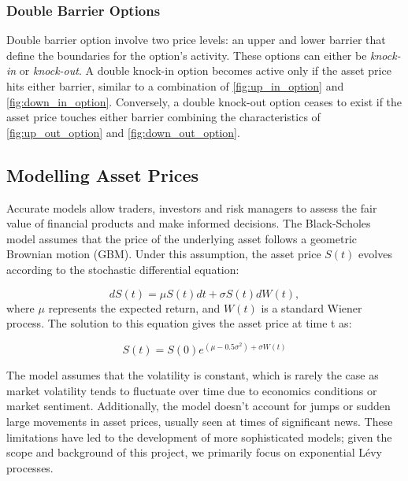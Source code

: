 \documentclass[a4paper]{report}
\begin{document}
\subsubsection{Double Barrier Options}
Double barrier option involve two price levels: an upper and lower barrier that define the boundaries for the option's activity. These options can either be \textit{knock-in} or \textit{knock-out}. A double knock-in option becomes active only if the asset price hits either barrier, similar to a combination of \autoref{fig:up_in_option} and \autoref{fig:down_in_option}. Conversely, a double knock-out option ceases to exist if the asset price touches either barrier combining the characteristics of \autoref{fig:up_out_option} and \autoref{fig:down_out_option}.

\subsection{Modelling Asset Prices}
Accurate models allow traders, investors and risk managers to assess the fair value of financial products and make informed decisions. The Black-Scholes model assumes that the price of the underlying asset follows a geometric Brownian motion (GBM). Under this assumption, the asset price $S(t)$ evolves according to the stochastic differential equation:

\begin{equation}\label{black_scholes_equation}
dS(t) = \mu S(t) dt + \sigma S(t) dW(t),	
\end{equation}
where $\mu$ represents the expected return, and $W(t)$ is a standard Wiener process. The solution to this equation gives the asset price at time t as:

\begin{equation}
S(t) = S(0)e^{(\mu - 0.5 \sigma^2) + \sigma W(t)}	
\end{equation}


The model assumes that the volatility is constant, which is rarely the case as market volatility tends to fluctuate over time due to economics conditions or market sentiment. Additionally, the model doesn't account for jumps or sudden large movements in asset prices, usually seen at times of significant news. These limitations have led to the development of more sophisticated models; given the scope and background of this project, we primarily focus on exponential L\'evy processes.
\end{document}
